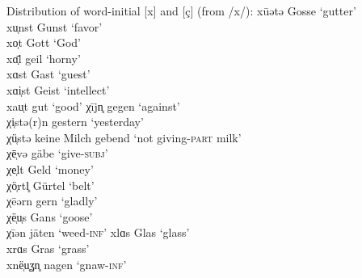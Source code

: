 \ea%
Distribution of word-initial [x] and [ç] (from /x/):\label{ex:4:30}
\ea\label{ex:4:30a}
      xūətə  \tab [xuːətə]  \tab  Gosse  \tab ‘gutter’      \\
      xu̜nst \tab  [xʊnst]  \tab   Gunst \tab  ‘favor’     \\
      xo̜t   \tab  [xɔt]    \tab   Gott  \tab  ‘God’       \\
      xɑ̣̄l  \tab  [xɑːl]   \tab  geil  \tab  ‘horny'      \\
      xɑst   \tab [xɑst]    \tab  Gast   \tab ‘guest’       \\
      xɑi̜st \tab  [xɑɪst]  \tab   Geist \tab  ‘intellect’ \\
      xau̜t  \tab  [xɑʊt]   \tab   gut   \tab  ‘good’     
\ex\label{ex:4:30b}
      χījn̥      \tab [çiːʝn̩]     \tab  gegen             \tab  ‘against’                          \\
      χi̜stə(r)n \tab [çɪstə(r)n]  \tab gestern            \tab ‘yesterday’                          \\
      χü̜stə     \tab [çʏstə]      \tab keine Milch gebend \tab ‘not giving\textsc{{}-part} milk’    \\
      χē̜və      \tab [çɛːvə]      \tab gäbe               \tab ‘give-\textsc{subj}’                \\
      χe̜lt      \tab [çɛlt]       \tab Geld               \tab ‘money’                             \\
      χö̜rtl̥     \tab [çœrtl̩]    \tab   Gürtel          \tab    ‘belt’                          \\
      χēərn     \tab [çeːərn]   \tab  gern                \tab ‘gladly’                              \\
      χë̜u̜s    \tab   [çɛʊs]   \tab    Gans              \tab   ‘goose’                           \\
      χīən      \tab [çiːən]    \tab  jäten               \tab ‘weed-\textsc{inf}’                   
\ex\label{ex:4:30c}   xlɑs      \tab [xlɑs]     \tab  Glas                \tab ‘glass’                              \\
      xrɑs      \tab [xrɑs]     \tab  Gras                \tab ‘grass’                            \\
      xnë̜u̜ʓn̥ \tab    [xnɛʊɣn̩]   \tab  nagen           \tab     ‘gnaw-\textsc{inf}’               
\z 
\z

